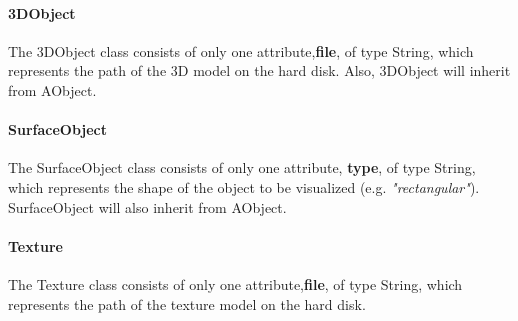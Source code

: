 \paragraph{3DObject}
The 3DObject class consists of only one attribute,\textbf{file}, of type String, which represents the path of the 3D model on the hard disk. Also, 3DObject will inherit from AObject.

\paragraph{SurfaceObject}
The SurfaceObject class consists of only one attribute, \textbf{type}, of type String, which represents the shape of the object to be visualized (e.g. \textit{"rectangular"}). SurfaceObject will also inherit from AObject.

\paragraph{Texture}
The Texture class consists of only one attribute,\textbf{file}, of type String, which represents the path of the texture model on the hard disk.


